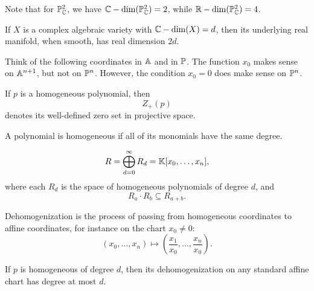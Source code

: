 Note that for $\pp^2_{\c}$, we have $\cdim(\pp^2_{\c}) = 2$, while $\rdim(\pp^2_{\c}) = 4$.

\begin{lemma*}{
    If $X$ is a complex algebraic variety with $\cdim(X) = d$, then its underlying real manifold, when smooth, has real dimension $2d$.
}
\end{lemma*}

Think of the following coordinates in $\aa$ and in $\pp$.
The function $x_0$ makes sense on $\aa^{n+1}$, but not on $\pp^n$.
However, the condition $x_0 = 0$ does make sense on $\pp^n$.

\begin{definition}
    If $p$ is a homogeneous polynomial, then
    \[
        Z_+(p)
    \]
    denotes its well-defined zero set in projective space.
\end{definition}

\begin{definition}[Homogeneous]
    A polynomial is homogeneous if all of its monomials have the same degree.
\end{definition}

\begin{definition}
    \[
        R = \bigoplus_{d=0}^{\infty} R_d = \kk[x_0,\ldots,x_n],
    \]
    where each $R_d$ is the space of homogeneous polynomials of degree $d$, and
    \[
        R_a\cdot R_b \subseteq R_{a+b}.
    \]
\end{definition}

\begin{definition}[Dehomogenization]
    Dehomogenization is the process of passing from homogeneous coordinates to affine coordinates, for instance on the chart $x_0\neq 0$:
    \[
        (x_0,\ldots,x_n)\mapsto \left(\frac{x_1}{x_0},\ldots,\frac{x_n}{x_0}\right).
    \]
\end{definition}

\begin{lemma*}{
    If $p$ is homogeneous of degree $d$, then its dehomogenization on any standard affine chart has degree at most $d$.
}
\end{lemma*}